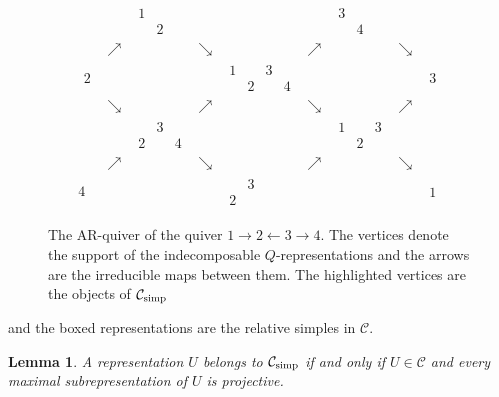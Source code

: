 \documentclass{amsart}
\numberwithin{equation}{section}
\newtheorem{lem}[thm]{Lemma}
\theoremstyle{remark}
\begin{document}
\begin{figure}\label{ara4}
\[
\begin{array}{ccccccccc}
&&\begin{smallmatrix}
    1&\\&2
\end{smallmatrix}&&&&\boxed{\begin{smallmatrix}
    3&\\&4
\end{smallmatrix}}&&\\
&\nearrow&&\searrow&&\nearrow&&\searrow&\\
\begin{smallmatrix}
    2
\end{smallmatrix}&&&&\boxed{\begin{smallmatrix}
    1&&3&\\&2&&4
\end{smallmatrix}}&&&&\boxed{\begin{smallmatrix}
    3
\end{smallmatrix}}\\
&\searrow&&\nearrow&&\searrow&&\nearrow&\\
&&\begin{smallmatrix}
    &3&\\2&&4
\end{smallmatrix}&&&&\begin{smallmatrix}
    1&&3\\&2&
\end{smallmatrix}&&\\
&\nearrow&&\searrow&&\nearrow&&\searrow&\\
4&&&&\boxed{\begin{smallmatrix}
    &3\\2&
\end{smallmatrix}}&&&&\boxed{\begin{smallmatrix}
    1
\end{smallmatrix}}
\end{array}
\]

\caption{The AR-quiver of the quiver $1\rightarrow 2\leftarrow 3\rightarrow 4$. 
The vertices denote the support of the indecomposable $Q$-representations and the arrows are the irreducible maps between them. The highlighted vertices are the objects of $\mathcal{C}_{\rm simp}$}\label{Eq:ArQuiverA4}
\end{figure}
and the boxed representations are the relative simples in $\mathcal{C}$.

\begin{lem}\label{Lem:Almost projective} A representation $U$ belongs to $\mathcal{C}_{\rm simp}$ if and only if $U\in\mathcal{C}$ and every maximal subrepresentation of $U$ is projective.
\end{lem}
\end{document}
